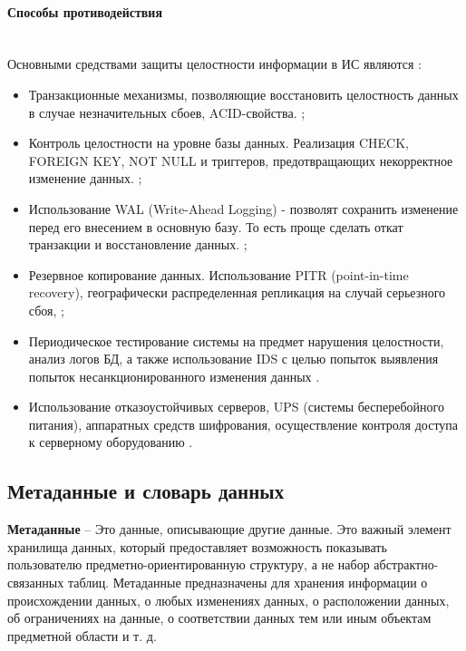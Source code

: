 \paragraph{Способы противодействия} ~\\

Основными средствами защиты целостности информации в ИС являются \autocite{Pirogov2009}:

\begin{itemize}
    \item Транзакционные механизмы, позволяющие восстановить целостность данных в случае незначительных сбоев, ACID-свойства. \autocite{worksol1, DBtest};
    \item Контроль целостности на уровне базы данных. Реализация CHECK, FOREIGN KEY, NOT NULL и триггеров, предотвращающих некорректное изменение данных. \autocite{flenovinfo};
    \item Использование WAL (Write-Ahead Logging) - позволят сохранить изменение перед его внесением в основную базу. То есть проще сделать откат транзакции и восстановление данных. \autocite{WALintro};
    \item Резервное копирование данных. Использование PITR (point-in-time recovery), географически распределенная репликация на случай серьезного сбоя, \autocite{PITRintro};
    \item Периодическое тестирование системы на предмет нарушения целостности, анализ логов БД, а также использование IDS с целью попыток выявления попыток несанкционированного изменения данных \autocite{DBtest}.
    \item Использование отказоустойчивых серверов, UPS (системы бесперебойного питания), аппаратных средств шифрования, осуществление контроля доступа к серверному оборудованию \autocite{tolerance1, tolerance2}.

\end{itemize}

\subsection{Метаданные и словарь данных}

\begin{grayquote}
	\textbf{Метаданные} -- Это данные, описывающие другие данные. Это важный элемент хранилища данных, который предоставляет возможность показывать пользователю предметно-ориентированную структуру, а не набор абстрактно-связанных таблиц. Метаданные предназначены для хранения информации о происхождении данных, о любых изменениях данных, о расположении данных, об ограничениях на данные, о соответствии данных тем или иным объектам предметной области и т. д. \autocite{Pirogov2009}
\end{grayquote}

